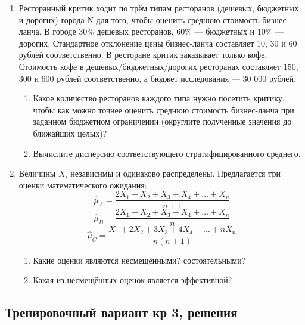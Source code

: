 \begin{enumerate}
\item Ресторанный критик ходит по трём типам ресторанов (дешевых, бюджетных и дорогих) города N для того, чтобы оценить среднюю стоимость бизнес-ланча. В городе 30\% дешевых ресторанов, 60\% — бюджетных и 10\% — дорогих. Стандартное отклонение цены бизнес-ланча составляет 10, 30 и 60 рублей соответственно. В ресторане критик заказывает только кофе. Стоимость кофе в дешевых/бюджетных/дорогих ресторанах составляет 150, 300 и 600 рублей соответственно, а бюджет исследования — 30 000 рублей.
\begin{enumerate}
\item Какое количество ресторанов каждого типа нужно посетить критику, чтобы как можно точнее оценить среднюю стоимость бизнес-ланча при заданном бюджетном ограничении (округлите полученные значения до ближайших целых)?
\item  Вычислите дисперсию соответствующего стратифицированного среднего.
\end{enumerate}



\item Величины $X_i$ независимы и одинаково распределены. Предлагается три оценки математического ожидания:
\[
\hat \mu_A = \frac{2X_1 + X_2 + X_3 + X_4 +\ldots + X_n}{n+1}
\]
\[
\hat \mu_B = \frac{2X_1 - X_2 + X_3 + X_4 + \ldots + X_n}{n}
\]
\[
\hat \mu_C = \frac{X_1 + 2X_2 + 3X_3 + 4X_4 + \ldots + nX_n}{n(n+1)}
\]

\begin{enumerate}
  \item Какие оценки являются несмещёнными? состоятельными?
  \item Какая из несмещённых оценок является эффективной?
\end{enumerate}
\end{enumerate}


\subsection{Тренировочный вариант кр 3, решения}

